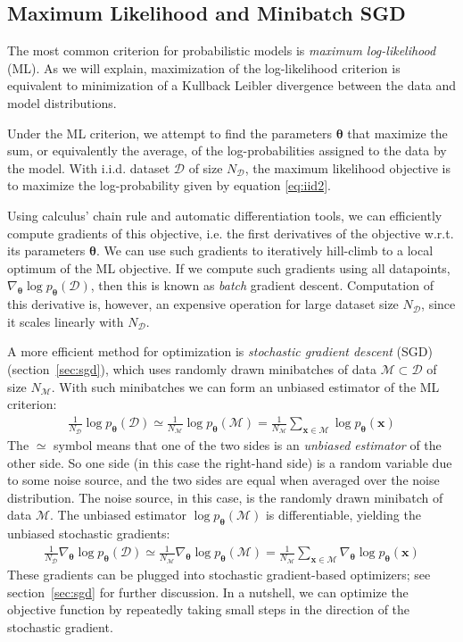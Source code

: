 \documentclass[MAL,biber]{nowfnt} %
\newcommand{\bb}[1]{\mathbf{#1}}
\newcommand{\bx}{\bb{x}}
\newcommand{\bT}{\boldsymbol{\theta}}
\newcommand{\pT}{p_{\bT}}
\begin{document}
\subsection{Maximum Likelihood and Minibatch SGD}
The most common criterion for probabilistic models is \emph{maximum log-likelihood} (ML). As we will explain, maximization of the log-likelihood criterion is equivalent to minimization of a Kullback Leibler divergence between the data and model distributions.

Under the ML criterion, we attempt to find the parameters $\bT$ that maximize the sum, or equivalently the average, of the log-probabilities assigned to the data by the model. With i.i.d. dataset $\mathcal{D}$ of size $N_\mathcal{D}$, the maximum likelihood objective is to maximize the log-probability given by equation \eqref{eq:iid2}.

Using calculus' chain rule and automatic differentiation tools, we can efficiently compute gradients of this objective, i.e. the first derivatives of the objective w.r.t. its parameters $\bT$. We can use such gradients to iteratively hill-climb to a local optimum of the ML objective.
If we compute such gradients using all datapoints, $\nabla_{\bT} \log \pT(\mathcal{D})$, then this is known as \emph{batch} gradient descent. Computation of this derivative is, however, an expensive operation for large dataset size $N_\mathcal{D}$, since it scales linearly with $N_\mathcal{D}$.

A more efficient method for optimization is \emph{stochastic gradient descent} (SGD) (section~\ref{sec:sgd}), which uses randomly drawn minibatches of data $\mathcal{M} \subset \mathcal{D}$ of size $N_\mathcal{M}$. With such minibatches we can form an unbiased estimator of the ML criterion:
\begin{align}
\frac{1}{N_\mathcal{D}} \log \pT(\mathcal{D})
\simeq \frac{1}{N_\mathcal{M}} \log \pT(\mathcal{M}) 
= \frac{1}{N_\mathcal{M}} \sum_{\bx \in \mathcal{M}} \log \pT(\bx)
\end{align}
The $\simeq$ symbol means that one of the two sides is an \emph{unbiased estimator} of the other side. So one side (in this case the right-hand side) is a random variable due to some noise source, and the two sides are equal when averaged over the noise distribution. The noise source, in this case, is the randomly drawn minibatch of data $\mathcal{M}$.  The unbiased estimator $\log \pT(\mathcal{M})$ is differentiable, yielding the unbiased stochastic gradients:
\begin{align}
\frac{1}{N_\mathcal{D}} \nabla_{\bT} \log \pT(\mathcal{D})
\simeq \frac{1}{N_\mathcal{M}} \nabla_{\bT} \log \pT(\mathcal{M})
= \frac{1}{N_\mathcal{M}} \sum_{\bx \in \mathcal{M}} \nabla_{\bT} \log \pT(\bx)
\end{align}
These gradients can be plugged into stochastic gradient-based optimizers; see section~\ref{sec:sgd} for further discussion. In a nutshell, we can optimize the objective function by repeatedly taking small steps in the direction of the stochastic gradient.
\end{document}
